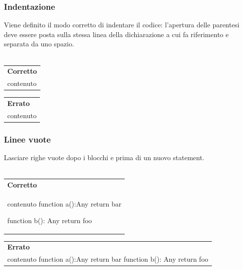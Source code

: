 \subsubsection{Indentazione}
Viene definito il modo corretto di indentare il codice: l'apertura delle parentesi deve essere posta sulla stessa linea della dichiarazione a cui fa riferimento e separata da uno spazio.\\\\
\begin{minipage}{0.45\textwidth}
\begin{tabular}{p{\textwidth}}	
	\textbf{Corretto}
	\begin{lstlisting}
	
	private fun Foo() {
	\\contenuto
	}
	
	\end{lstlisting}
\end{tabular}
\end{minipage}
\hfill
\begin{minipage}{0.45\textwidth}
\begin{tabular}{|p{\textwidth}}

\textbf{Errato}
\begin{lstlisting}
	private fun Foo()
	{
	\\contenuto
	}

\end{lstlisting}
\end{tabular}

\end{minipage}


\subsubsection{Linee vuote} Lasciare righe vuote dopo i blocchi e prima di un nuovo statement. \\\\
\begin{minipage}{0.45\textwidth}
	\begin{tabular}{p{\textwidth}}	
		\textbf{Corretto}
		\begin{lstlisting}
	\\contenuto
		function a():Any {
		return bar
		}
		
		function b(): Any {
		return foo
		}
					
		\end{lstlisting}
	\end{tabular}
\end{minipage}
\hfill
\begin{minipage}{0.45\textwidth}
	\begin{tabular}{|p{\textwidth}}
		
		\textbf{Errato}
		\begin{lstlisting}
	\\contenuto
		function a():Any {
		return bar
		}	
		function b(): Any {
		return foo
		}
		\end{lstlisting}
	\end{tabular}
	
\end{minipage}
